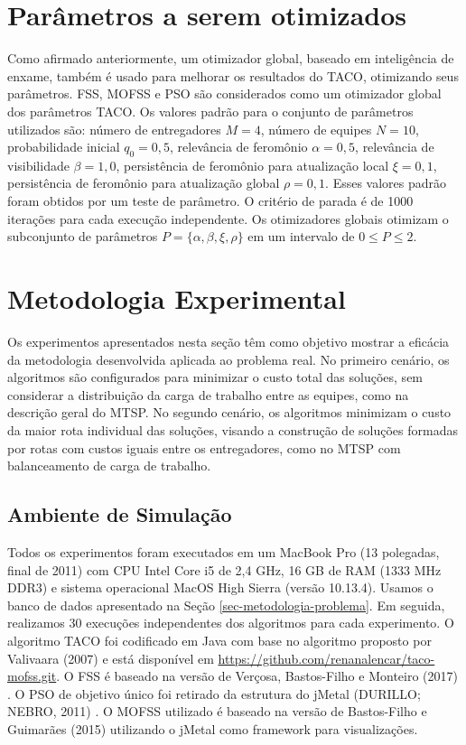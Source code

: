 \section{Parâmetros a serem otimizados}
\label{sec-metodologia-parametros}

Como afirmado anteriormente, um otimizador global, baseado em inteligência de enxame, também é usado para melhorar os resultados do TACO, otimizando seus parâmetros. FSS, MOFSS e PSO são considerados como um otimizador global dos parâmetros TACO. Os valores padrão para o conjunto de parâmetros utilizados são: número de entregadores $M = 4$, número de equipes $N = 10$, probabilidade inicial $q_0 = 0,5$, relevância de feromônio $\alpha = 0,5$, relevância de visibilidade $\beta = 1,0$, persistência de feromônio para atualização local $\xi = 0,1$, persistência de feromônio para atualização global $\rho = 0,1$. Esses valores padrão foram obtidos por um teste de parâmetro. O critério de parada é de 1000 iterações para cada execução independente. Os otimizadores globais otimizam o subconjunto de parâmetros $P = \{\alpha, \beta, \xi, \rho\}$ em um intervalo de $0 \leq P \leq 2$.

\section{Metodologia Experimental}
\label{sec-metodologia-experimento}

Os experimentos apresentados nesta seção têm como objetivo mostrar a eficácia da metodologia desenvolvida aplicada ao problema real. No primeiro cenário, os algoritmos são configurados para minimizar o custo total das soluções, sem considerar a distribuição da carga de trabalho entre as equipes, como na descrição geral do MTSP. No segundo cenário, os algoritmos minimizam o custo da maior rota individual das soluções, visando a construção de soluções formadas por rotas com custos iguais entre os entregadores, como no MTSP com balanceamento de carga de trabalho.

\subsection{Ambiente de Simulação}
\label{subsec-metodologia-experimento}

Todos os experimentos foram executados em um MacBook Pro (13 polegadas, final de 2011) com CPU Intel Core i5 de 2,4 GHz, 16 GB de RAM (1333 MHz DDR3) e sistema operacional MacOS High Sierra (versão 10.13.4). Usamos o banco de dados apresentado na Seção \ref{sec-metodologia-problema}. Em seguida, realizamos 30 execuções independentes dos algoritmos para cada experimento. O algoritmo TACO foi codificado em Java com base no algoritmo proposto por Valivaara (2007) e está disponível em \url{https://github.com/renanalencar/taco-mofss.git}. O FSS é baseado na versão de Verçosa, Bastos-Filho e Monteiro (2017) \cite{verccosa2017combining}. O PSO de objetivo único foi retirado da estrutura do jMetal (DURILLO; NEBRO, 2011) \cite{durillo2011jmetal}. O MOFSS utilizado é baseado na versão de Bastos-Filho e Guimarães (2015) \cite{bastos2015multi} utilizando o jMetal como framework para visualizações.

